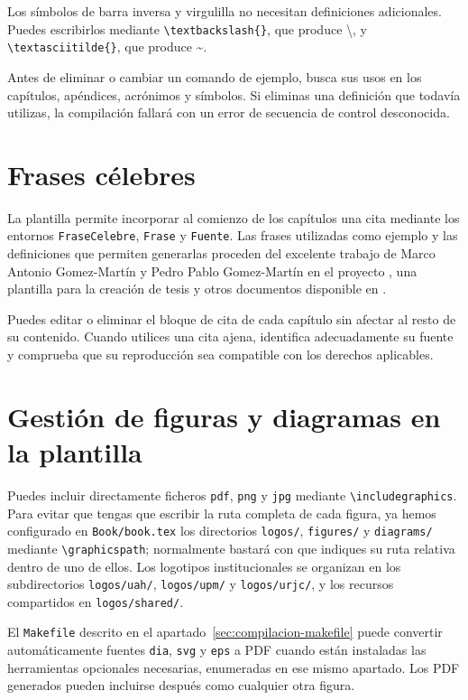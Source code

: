 Los símbolos de barra inversa y virgulilla no necesitan definiciones adicionales. Puedes escribirlos mediante \texttt{\textbackslash{}textbackslash\{\}}, que produce \textbackslash{}, y \texttt{\textbackslash{}textasciitilde\{\}}, que produce \textasciitilde{}.

Antes de eliminar o cambiar un comando de ejemplo, busca sus usos en los capítulos, apéndices, acrónimos y símbolos. Si eliminas una definición que todavía utilizas, la compilación fallará con un error de secuencia de control desconocida.

\section{Frases célebres}
\label{sec:uso-de-frases}

La plantilla permite incorporar al comienzo de los capítulos una cita mediante los entornos \texttt{FraseCelebre}, \texttt{Frase} y \texttt{Fuente}. Las frases utilizadas como ejemplo y las definiciones que permiten generarlas proceden del excelente trabajo de Marco Antonio Gomez-Martín y Pedro Pablo Gomez-Martín en el proyecto \texis{}, una plantilla para la creación de tesis y otros documentos disponible en \cite{texis}.

Puedes editar o eliminar el bloque de cita de cada capítulo sin afectar al resto de su contenido. Cuando utilices una cita ajena, identifica adecuadamente su fuente y comprueba que su reproducción sea compatible con los derechos aplicables.

\section{Gestión de figuras y diagramas en la plantilla}
\label{sec:diagrama}

Puedes incluir directamente ficheros \texttt{pdf}, \texttt{png} y \texttt{jpg} mediante \texttt{\textbackslash{}includegraphics}. Para evitar que tengas que escribir la ruta completa de cada figura, ya hemos configurado en \texttt{Book/book.tex} los directorios \texttt{logos/}, \texttt{figures/} y \texttt{diagrams/} mediante \texttt{\textbackslash{}graphicspath}; normalmente bastará con que indiques su ruta relativa dentro de uno de ellos. Los logotipos institucionales se organizan en los subdirectorios \texttt{logos/uah/}, \texttt{logos/upm/} y \texttt{logos/urjc/}, y los recursos compartidos en \texttt{logos/shared/}.

El \texttt{Makefile} descrito en el apartado~\ref{sec:compilacion-makefile} puede convertir automáticamente fuentes \texttt{dia}, \texttt{svg} y \texttt{eps} a PDF cuando están instaladas las herramientas opcionales necesarias, enumeradas en ese mismo apartado. Los PDF generados pueden incluirse después como cualquier otra figura.

